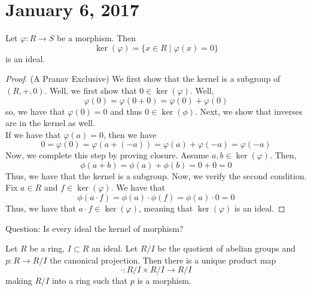\section{January 6, 2017} %
\begin{fact}
    Let $\varphi: R \rightarrow S$ be a morphism. Then
    $$
    \ker(\varphi) = \{x \in R \mid \varphi(x) = 0\}
    $$
    is an ideal.
\end{fact}
\begin{proof} (A Pranav Exclusive)
    We first show that the kernel is a subgroup of $(R, +, 0)$. Well, we first show that
    $0 \in \ker(\varphi)$. Well,
    $$
    \varphi(0) = \varphi(0 + 0) = \varphi(0) + \varphi(0)
    $$
    so, we have that $\varphi(0) = 0$ and thus $0 \in \ker(\phi)$.
    Next, we show that inverses are in the kernel as well. \\
    If we have that $\varphi(a) = 0$, then we have
    $$0 = \varphi(0) = \varphi(a + (-a)) = \varphi(a) + \varphi(-a) = \varphi(-a)$$
    Now, we complete this step by proving closure. Assume $a,b \in \ker(\varphi)$. Then,
    $$\phi(a + b) = \phi(a) + \phi(b) = 0 + 0 = 0$$
    Thus, we have that the kernel is a subgroup. Now, we verify the second condition.
    Fix $a \in R$ and $f \in \ker(\varphi)$. We have that
    $$
    \phi(a \cdot f) = \phi(a) \cdot \phi(f) = \phi(a) \cdot 0 = 0
    $$
    Thus, we have that $a \cdot f \in \ker(\varphi)$, meaning that $\ker(\varphi)$
    is an ideal.
\end{proof}
\noindent Question: Is every ideal the kernel of morphism?
\begin{prop}
    Let $R$ be a ring, $I \subset R$ an ideal. Let $R / I$ be the quotient of
    abelian groups and $p: R \rightarrow R / I$ the canonical projection. Then there is a
    unique product map
    $$
    \cdot: R/I \times R/I \rightarrow R/I
    $$
    making $R / I$ into a ring such that $p$ is a morphism.
\end{prop}
